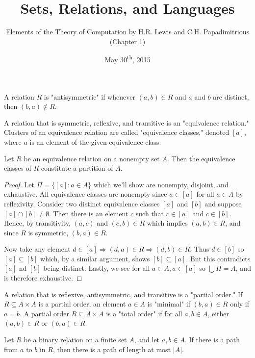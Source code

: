 \documentclass[a4paper,8pt]{article}
\title{Sets, Relations, and Languages}
\author{Elements of the Theory of Computation by H.R. Lewis and C.H. Papadimitrious (Chapter 1)}
\date{May 30\textsuperscript{th}, 2015}
\begin{document}
\maketitle
{}

\begin{outline}

    A relation \(R\) is "antisymmetric" if whenever \((a,b)\in R\) and \(a\) and \(b\) are distinct, then
    \((b, a) \not\in R\).

    A relation that is symmetric, reflexive, and transitive is an "equivalence relation." Clusters of an
    equivalence relation are called "equivalence classes," denoted \([a]\), where \(a\) is an element of the
    given equivalence class.

    Let \(R\) be an equivalence relation on a nonempty set \(A\). Then the equivalence classes of \(R\) constitute
    a partition of \(A\).

    \begin{proof}
      Let \(\Pi = \{[a] : a \in A\}\) which we'll show are nonempty, disjoint, and exhaustive. All equivalence classes
      are nonempty since \(a \in [a]\) for all \(a \in A\) by reflexivity. Consider two distinct equivalence classes
      \([a]\) and \([b]\) and suppose \([a] \cap [b] \neq \emptyset\). Then there is an element \(c\) such that
      \(c \in [a]\) and \(c \in [b]\). Hence, by transitivity, \((a, c)\) and \((c, b) \in R\) which implies
      \((a, b) \in R\), and since \(R\) is symmetric, \((b, a) \in R\).

      Now take any element \(d \in [a] \Rightarrow (d, a)\in R \Rightarrow (d, b) \in R\). Thus \(d \in [b]\) so
      \([a] \subseteq [b]\) which, by a similar argument, shows \([b] \subseteq [a]\). But this contradicts
      \([a]\) nd \([b]\) being distinct. Lastly, we see for all \(a \in A, a \in [a]\) so \(\bigcup\Pi = A\),
      and is therefore exhaustive.
    \end{proof}

    A relation that is reflexive, antisymmetric, and transitive is a "partial order." If \(R \subseteq A \times A\)
    is a partial order, an element \(a \in A\) is "minimal" if \((b, a)\in R\) only if \(a=b\). A partial order
    \(R \subseteq A\times A\) is a "total order" if for all \(a, b \in A\), either \((a, b)\in R\) or
    \((b, a)\in R\).

    Let \(R\) be a binary relation on a finite set \(A\), and let \(a, b\in A\). If there is a path from \(a\) to
    \(b\) in \(R\), then there is a path of length at most \(|A|\).


\end{outline}
\end{document}

